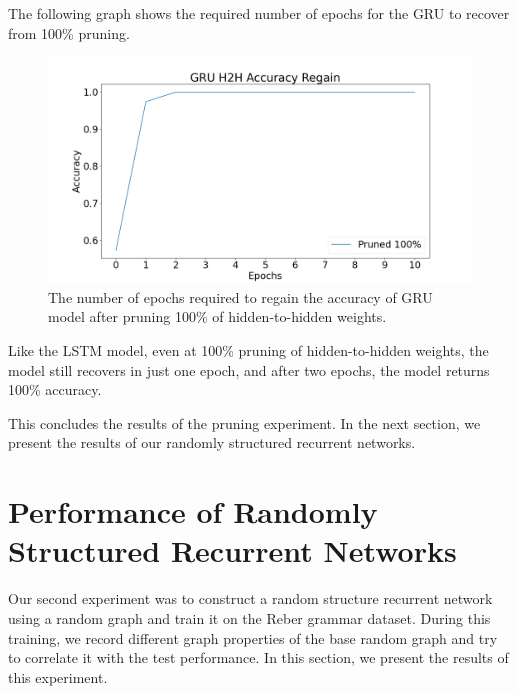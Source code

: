 The following graph shows the required number of epochs for the GRU to recover from 100\% pruning.

\begin{figure}[h]
	\centering
	\includegraphics[width=0.8\linewidth]{images/results/pruning_h2h/gru_h2h_accuracy_regain.png}
	\caption[GRU base model performance regain after pruning h2h weights]%
	{The number of epochs required to regain the accuracy of GRU model after pruning 100\% of hidden-to-hidden weights.}
	\label{fig:gru_h2h_prune_regain}
\end{figure}

Like the LSTM model, even at 100\% pruning of hidden-to-hidden weights, the model still recovers in just one epoch, and after two epochs, the model returns 100\% accuracy.

This concludes the results of the pruning experiment. In the next section, we present the results of our randomly structured recurrent networks.


\section{Performance of Randomly Structured Recurrent Networks}\label{section:r_st_rn}

Our second experiment was to construct a random structure recurrent network using a random graph and train it on the Reber grammar dataset. During this training, we record different graph properties of the base random graph and try to correlate it with the test performance. In this section, we present the results of this experiment.

